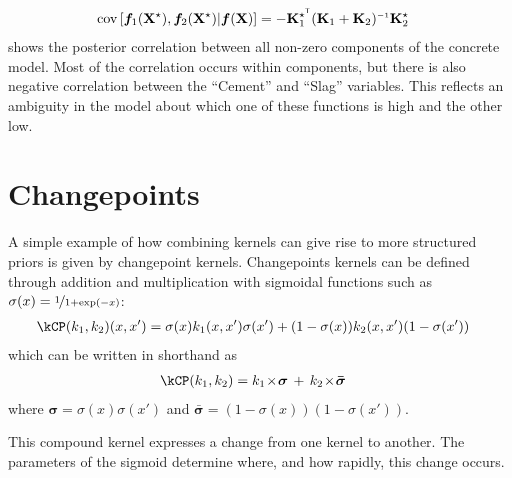 %
%
\begin{align}
\covargs{ \vf_1(\vX^\star)}{\vf_2(\vX^\star) | \vf(\vX) } 
& = - \vK_1^{\star\tra} (\vK_1 + \vK_2)\inv \vK_2^\star
\label{eq:post-component-cov}
\end{align}
%
 shows the posterior correlation between all non-zero components of the concrete model.
Most of the correlation occurs within components, but there is also negative correlation between the ``Cement'' and ``Slag'' variables.
This reflects an ambiguity in the model about which one of these functions is high and the other low.






\section{Changepoints}
A simple example of how combining kernels can give rise to more structured priors is given by changepoint kernels.
Changepoints kernels can be defined through addition and multiplication with sigmoidal functions such as $\sigma(x) = \nicefrac{1}{1 + \exp(-x)}$:
%
\begin{align}
\kCP(\kernel_1, \kernel_2)(x,x') & = \sigma(x) k_1(x,x')\sigma(x') + (1-\sigma(x)) k_2(x,x')(1-\sigma(x'))
\label{eq:cp}
\end{align}
%
which can be written in shorthand as
%
\begin{align}
\kCP(\kernel_1, \kernel_2)& = \kernel_1 \kerntimes \boldsymbol\sigma \kernplus \kernel_2 \kerntimes \boldsymbol{\bar\sigma}
\end{align}
where $\boldsymbol\sigma = \sigma(x)\sigma(x')$ and $\boldsymbol{\bar\sigma} = (1-\sigma(x))(1-\sigma(x'))$.

This compound kernel expresses a change from one kernel to another.
The parameters of the sigmoid determine where, and how rapidly, this change occurs.

